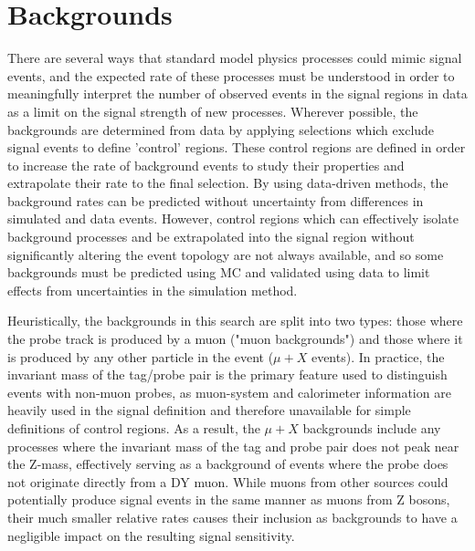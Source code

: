 \chapter{Backgrounds}
\label{backgrounds}
There are several ways that standard model physics processes could mimic signal events, and the expected rate of these processes must be understood in order to meaningfully interpret the number of observed events in the signal regions in data as a limit on the signal strength of new processes.
Wherever possible, the backgrounds are determined from data by applying selections which exclude signal events to define 'control' regions.
These control regions are defined in order to increase the rate of background events to study their properties and extrapolate their rate to the final selection.
By using data-driven methods, the background rates can be predicted without uncertainty from differences in simulated and data events. 
However, control regions which can effectively isolate background processes and be extrapolated into the signal region without significantly altering the event topology are not always available, and so some backgrounds must be predicted using MC and validated using data to limit effects from uncertainties in the simulation method.

Heuristically, the backgrounds in this search are split into two types: those where the probe track is produced by a muon ("muon backgrounds") and those where it is produced by any other particle in the event ($\mu+X$ events).
In practice, the invariant mass of the tag/probe pair is the primary feature used to distinguish events with non-muon probes, as muon-system and calorimeter information are heavily used in the signal definition and therefore unavailable for simple definitions of control regions.
As a result, the $\mu+X$ backgrounds include any processes where the invariant mass of the tag and probe pair does not peak near the Z-mass, effectively serving as a background of events where the probe does not originate directly from a DY muon.
While muons from other sources could potentially produce signal events in the same manner as muons from Z bosons, their much smaller relative rates causes their inclusion as backgrounds to have a negligible impact on the resulting signal sensitivity.

